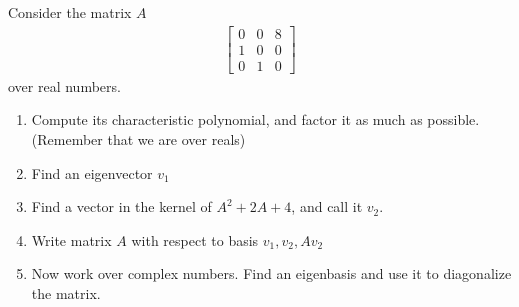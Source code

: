 \documentclass[12pt]{amsart}
\begin{document}
	Consider the matrix $A$
		\begin{align*}
			\begin{bmatrix}
					0 & 0 & 8 \\
					1 & 0 & 0 \\
					0 & 1 & 0
			\end{bmatrix}
		\end{align*}
		over real numbers.
			
	\begin{enumerate}
		\item Compute its characteristic polynomial, and factor it as much as possible. (Remember that we are over reals)
		\item Find an eigenvector $v_1$
		\item Find a vector in the kernel of $A^2 + 2A + 4$, and call it  $v_2$.
		\item Write matrix $A$ with respect to basis $v_1, v_2, Av_2$
		\item Now work over complex numbers. Find an eigenbasis and use it to diagonalize the matrix.
	\end{enumerate}
\end{document}

